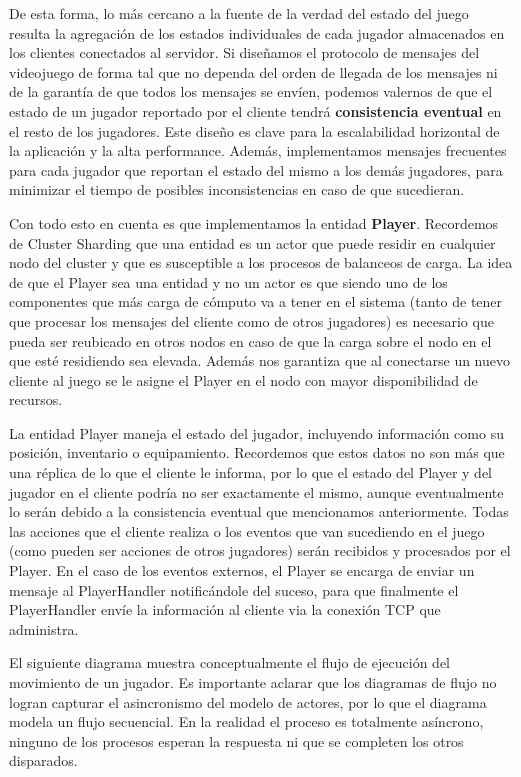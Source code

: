 De esta forma, lo más cercano a la fuente de la verdad del estado del juego resulta la agregación de los estados individuales
de cada jugador almacenados en los clientes conectados al servidor. Si diseñamos el protocolo de mensajes del videojuego de forma tal
que no dependa del orden de llegada de los mensajes ni de la garantía de que todos los mensajes se envíen, podemos valernos de que
el estado de un jugador reportado por el cliente tendrá \textbf{consistencia eventual} en el resto de los jugadores.
Este diseño es clave para la escalabilidad horizontal de la aplicación y la alta performance. Además, implementamos mensajes frecuentes
para cada jugador que reportan el estado del mismo a los demás jugadores, para minimizar el tiempo de posibles inconsistencias en caso de que
sucedieran.

Con todo esto en cuenta es que implementamos la entidad \textbf{Player}. Recordemos de Cluster Sharding que una entidad es un actor que puede residir
en cualquier nodo del cluster y que es susceptible a los procesos de balanceos de carga. La idea de que el Player sea una entidad y no un actor
es que siendo uno de los componentes que más carga de cómputo va a tener en el sistema (tanto de tener que procesar los mensajes del cliente como de otros jugadores)
es necesario que pueda ser reubicado en otros nodos en caso de que la carga sobre el nodo en el que esté residiendo sea elevada.
Además nos garantiza que al conectarse un nuevo cliente al juego se le asigne el Player en el nodo con mayor disponibilidad de recursos.

La entidad Player maneja el estado del jugador, incluyendo información como su posición, inventario o equipamiento. Recordemos que estos datos no son más que una réplica de lo que
el cliente le informa, por lo que el estado del Player y del jugador en el cliente podría no ser exactamente el mismo, aunque eventualmente lo serán debido a la consistencia eventual
que mencionamos anteriormente. Todas las acciones que el cliente realiza o los eventos que van sucediendo en el juego (como pueden ser acciones de otros
jugadores) serán recibidos y procesados por el Player. En el caso de los eventos externos, el Player se encarga de enviar un mensaje
al PlayerHandler notificándole del suceso, para que finalmente el PlayerHandler envíe la información al cliente via la conexión TCP que administra.

El siguiente diagrama muestra conceptualmente el flujo de ejecución del movimiento de un jugador. Es importante aclarar que los diagramas de flujo no logran capturar
el asincronismo del modelo de actores, por lo que el diagrama modela un flujo secuencial. En la realidad el proceso es totalmente asíncrono, ninguno de los procesos esperan
la respuesta ni que se completen los otros disparados.

